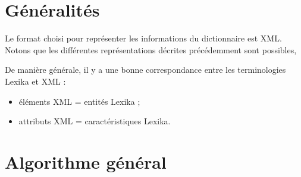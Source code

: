 \documentclass[10pt]{report}
\begin{document}
\section{Généralités}

Le format choisi pour représenter les informations du dictionnaire est XML. Notons que les différentes représentations décrites précédemment sont possibles, 

\bigskip

De manière générale, il y a une bonne correspondance entre les terminologies Lexika et XML :
\begin{itemize}
	\item éléments XML = entités Lexika ;
	\item attributs XML = caractéristiques Lexika.
\end{itemize}

\section{Algorithme général}
\end{document}
